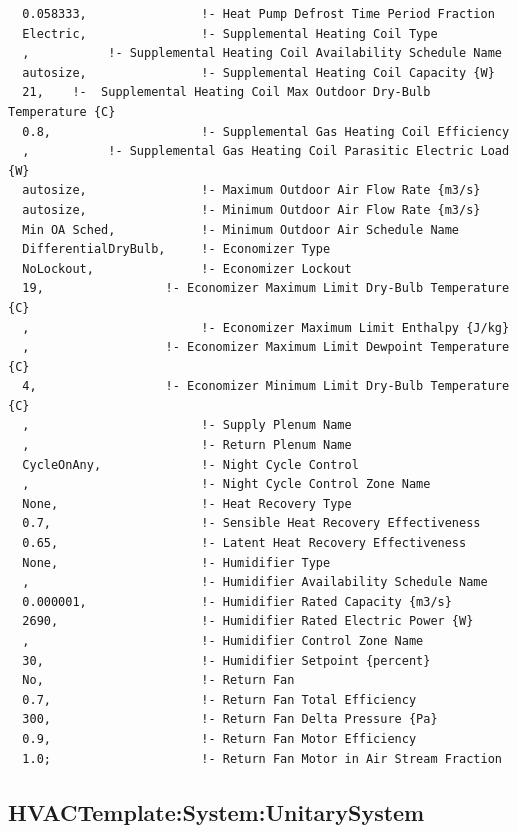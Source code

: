 \begin{lstlisting}
  0.058333,                !- Heat Pump Defrost Time Period Fraction
  Electric,                !- Supplemental Heating Coil Type
  ,           !- Supplemental Heating Coil Availability Schedule Name
  autosize,                !- Supplemental Heating Coil Capacity {W}
  21,    !-  Supplemental Heating Coil Max Outdoor Dry-Bulb Temperature {C}
  0.8,                     !- Supplemental Gas Heating Coil Efficiency
  ,           !- Supplemental Gas Heating Coil Parasitic Electric Load {W}
  autosize,                !- Maximum Outdoor Air Flow Rate {m3/s}
  autosize,                !- Minimum Outdoor Air Flow Rate {m3/s}
  Min OA Sched,            !- Minimum Outdoor Air Schedule Name
  DifferentialDryBulb,     !- Economizer Type
  NoLockout,               !- Economizer Lockout
  19,                 !- Economizer Maximum Limit Dry-Bulb Temperature {C}
  ,                        !- Economizer Maximum Limit Enthalpy {J/kg}
  ,                   !- Economizer Maximum Limit Dewpoint Temperature {C}
  4,                  !- Economizer Minimum Limit Dry-Bulb Temperature {C}
  ,                        !- Supply Plenum Name
  ,                        !- Return Plenum Name
  CycleOnAny,              !- Night Cycle Control
  ,                        !- Night Cycle Control Zone Name
  None,                    !- Heat Recovery Type
  0.7,                     !- Sensible Heat Recovery Effectiveness
  0.65,                    !- Latent Heat Recovery Effectiveness
  None,                    !- Humidifier Type
  ,                        !- Humidifier Availability Schedule Name
  0.000001,                !- Humidifier Rated Capacity {m3/s}
  2690,                    !- Humidifier Rated Electric Power {W}
  ,                        !- Humidifier Control Zone Name
  30,                      !- Humidifier Setpoint {percent}
  No,                      !- Return Fan
  0.7,                     !- Return Fan Total Efficiency
  300,                     !- Return Fan Delta Pressure {Pa}
  0.9,                     !- Return Fan Motor Efficiency
  1.0;                     !- Return Fan Motor in Air Stream Fraction
\end{lstlisting}

\subsection{HVACTemplate:System:UnitarySystem}\label{hvactemplatesystemunitarysystem}

